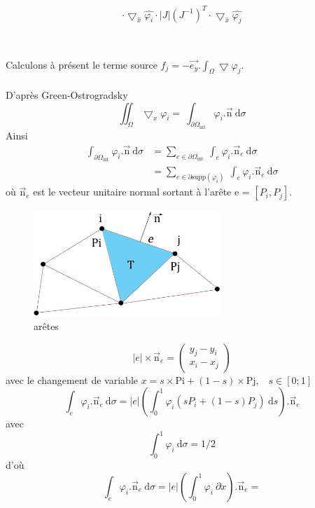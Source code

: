 \documentclass[a4paper,12pt,titlepage]{report}
\begin{document}
\begin{onehalfspace}
\[{\begin{aligned}
	\cdot
	\bigtriangledown_{\hat{x}} \hat{\varphi_{i}} \cdot
	|J| (J^{-1})^{T} 
	\cdot
	\bigtriangledown_{\hat{x}} \hat{\varphi_{j}} \\
\end{aligned}}
\]
\\
\\
Calculons à présent le terme source $f_{j} =  -\vec{e_{y}}.\int_{\Omega} \bigtriangledown\varphi_{j}$.
\\
\\
D'après Green-Ostrogradsky
\[
	\iint_{\Omega}\bigtriangledown_{x}{\varphi_{i}} =\ 
	\int_{\partial\Omega_{\text{int}}}\varphi_{i}.\vec{\text{n}} \ \text{d} \sigma
\]
Ainsi	
\[
	\begin{aligned}
		\int_{\partial\Omega_{\text{int}}}\varphi_{i}.\vec{\text{n}}\ \text{d} \sigma &= 
		\sum_{e \in \partial\Omega_{\text{int}}}\ \int_{e}\varphi_{i}.\vec{\text{n}}_{e}\ \text{d} \sigma \\ &=  
		\sum_{e \in \partial\text{supp}(\varphi_{i})}\ \int_{e}\varphi_{i}.\vec{\text{n}}_{e}\ \text{d} \sigma
	\end{aligned}
\]
où $\vec{\text{n}}_{e}$ est le vecteur unitaire normal sortant à l'arête e = $[P_i,P_j]$. \\
\begin{figure}[h]
\begin{center}
\includegraphics[height = 4cm, keepaspectratio]{graphes/bord.png}
\caption{arêtes}
\label{figure 1}
\end{center}
\end{figure}
\[
	|e|\times \vec{\text{n}}_{e}
	=
	\begin{pmatrix}
		y_{j}-y_{i} \\
		x_{i}-x_{j}
	\end{pmatrix}
\]
avec le changement de variable $x = s\times \text{Pi} + (1-s)\times \text{Pj}$,\ \ $s \in [0;1]$
\[
	\int_{e}\varphi_{i}.\vec{\text{n}}_{e}\ \text{d} \sigma = |e|(\int_{0}^{1}\varphi_{i}(sP_i + (1-s)P_j)\ \text{d} s).\vec{\text{n}}_{e}
\]
avec 
\[
	\int_{0}^{1}\varphi_{i}\ \text{d} \sigma  = 1/2
\]
d'où
\[
	\int_{e}\varphi_{i}.\vec{\text{n}}_{e}\ \text{d} \sigma =
	|e|(\int_{0}^{1}\varphi_{i}\ \partial x ).\vec{\text{n}}_{e} =
\]
\end{onehalfspace}
\end{document}
